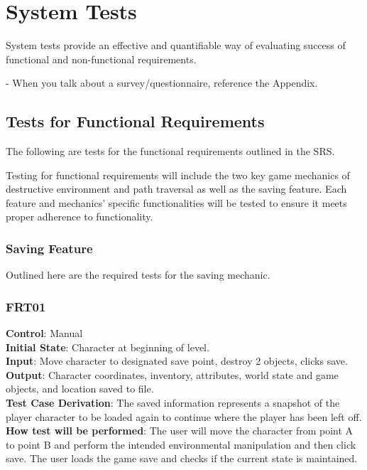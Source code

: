 \documentclass[12pt, titlepage]{article}
\begin{document}
\section{System Tests}

System tests provide an effective and quantifiable way of evaluating success of functional and non-functional requirements.

- When you talk about a survey/questionnaire, reference the Appendix.

\subsection{Tests for Functional Requirements}

The following are tests for the functional requirements outlined in the SRS.

Testing for functional requirements will include the two key game mechanics of destructive environment and path traversal as well as the saving feature. Each feature and mechanics’ specific functionalities will be tested to ensure it meets proper adherence to functionality.

\subsubsection{Saving Feature}

Outlined here are the required tests for the saving mechanic.

\subsubsection{FRT01}

\textbf{Control}: Manual\\
\textbf{Initial State}: Character at beginning of level.\\
\textbf{Input}: Move character to designated save point, destroy 2 objects, clicks save.\\
\textbf{Output}: Character coordinates, inventory, attributes, world state and game objects, and location saved to file.\\
\textbf{Test Case Derivation}: The saved information represents a snapshot of the player character to be loaded again to continue where the player has been left off.\\
\textbf{How test will be performed}: The user will move the character from point A to point B and perform the intended environmental manipulation and then click save.  The user loads the game save and checks if the current state is maintained.\\
\end{document}
